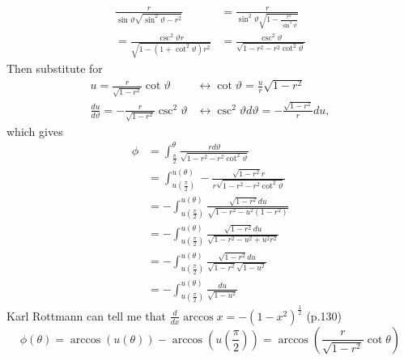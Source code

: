 \documentclass[11pt]{amsart}
\begin{document}
\begin{align*}
\frac{r}{\sin\vartheta\sqrt{\sin^2\vartheta-r^2}} &= \frac{r}{\sin^2\vartheta\sqrt{1 - \frac{r^2}{\sin^2\vartheta}}} \\
= \frac{\csc^2\vartheta r}{\sqrt{1-(1+\cot^2\vartheta)r^2}} &= \frac{\csc^2\vartheta}{\sqrt{1-r^2-r^2\cot^2\vartheta}}
\end{align*}
Then substitute for
\begin{align*}
u = \frac{r}{\sqrt{1-r^2}}\cot\vartheta &\leftrightarrow \cot\vartheta = \frac{u}{r}\sqrt{1-r^2} \\
\frac{du}{d\vartheta} = -\frac{r}{\sqrt{1-r^2}}\csc^2\vartheta &\leftrightarrow \csc^2\vartheta d\vartheta = -\frac{\sqrt{1-r^2}}{r}du,
\end{align*}
which gives
\begin{align*}
\phi &= \int_{\frac{\pi}{2}}^{\theta} \frac{rd\vartheta}{\sqrt{1-r^2-r^2\cot^2\vartheta}} \\
	&= \int_{u(\frac{\pi}{2})}^{u(\theta)} -\frac{\sqrt{1-r^2} r}{r\sqrt{1-r^2-r^2\cot^2\vartheta}} \\
	&= -\int_{u(\frac{\pi}{2})}^{u(\theta)} \frac{\sqrt{1-r^2}du}{\sqrt{1-r^2 - u^2(1-r^2)}} \\
	&= -\int_{u(\frac{\pi}{2})}^{u(\theta)} \frac{\sqrt{1-r^2} du}{\sqrt{1-r^2-u^2+u^2r^2}} \\
	&= -\int_{u(\frac{\pi}{2})}^{u(\theta)} \frac{\sqrt{1-r^2} du}{\sqrt{1-r^2}\sqrt{1-u^2}}\\
	&= -\int_{u(\frac{\pi}{2})}^{u(\theta)} \frac{du}{\sqrt{1-u^2}}	
\end{align*}
Karl Rottmann can tell me that $\frac{d}{dx}\arccos x = -(1-x^2)^{\frac{1}{2}}$ (p.130)
\begin{equation}
\phi(\theta) = \arccos(u(\theta)) - \arccos(u(\frac{\pi}{2})) = \arccos(\frac{r}{\sqrt{1-r^2}}\cot\theta)
\end{equation}
\end{document}
